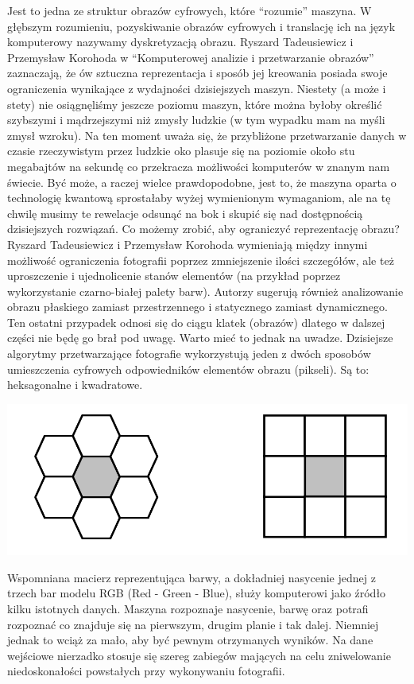 \documentclass{article}
\begin{document}
Jest to jedna ze struktur obrazów cyfrowych, które “rozumie” maszyna. W głębszym rozumieniu, pozyskiwanie obrazów cyfrowych i translację ich na język komputerowy nazywamy dyskretyzacją obrazu. Ryszard Tadeusiewicz i Przemysław Korohoda w “Komputerowej analizie i przetwarzanie obrazów” \cite{ref8} zaznaczają, że ów sztuczna reprezentacja i sposób jej kreowania posiada swoje ograniczenia wynikające z wydajności dzisiejszych maszyn. Niestety (a może i stety) nie osiągnęliśmy jeszcze poziomu maszyn, które można byłoby określić szybszymi i mądrzejszymi niż zmysły ludzkie (w tym wypadku mam na myśli zmysł wzroku). Na ten moment uważa się, że przybliżone przetwarzanie danych w czasie rzeczywistym przez ludzkie oko plasuje się na poziomie około stu megabajtów na sekundę co przekracza możliwości komputerów w znanym nam świecie. Być może, a raczej wielce prawdopodobne, jest to, że maszyna oparta o technologię kwantową sprostałaby wyżej wymienionym wymaganiom, ale na tę chwilę musimy te rewelacje odsunąć na bok i skupić się nad dostępnością dzisiejszych rozwiązań. Co możemy zrobić, aby ograniczyć reprezentację obrazu? Ryszard Tadeusiewicz i Przemysław Korohoda wymieniają między innymi możliwość ograniczenia fotografii poprzez zmniejszenie ilości szczegółów, ale też uproszczenie i ujednolicenie stanów elementów (na przykład poprzez wykorzystanie czarno-białej palety barw). Autorzy sugerują również analizowanie obrazu płaskiego zamiast przestrzennego i statycznego zamiast dynamicznego. Ten ostatni przypadek odnosi się do ciągu klatek (obrazów) dlatego w dalszej części nie będę go brał pod uwagę. Warto mieć to jednak na uwadze. Dzisiejsze algorytmy przetwarzające fotografie wykorzystują jeden z dwóch sposobów umieszczenia cyfrowych odpowiedników elementów obrazu (pikseli). Są to: heksagonalne i kwadratowe.
\begin{center}
\includegraphics[width=15cm]{dyskretyzacja}
\end{center}
Wspomniana macierz reprezentująca barwy, a dokładniej nasycenie jednej z trzech bar modelu RGB (Red - Green - Blue), służy komputerowi jako źródło kilku istotnych danych. Maszyna rozpoznaje nasycenie, barwę oraz potrafi rozpoznać co znajduje się na pierwszym, drugim planie i tak dalej. Niemniej jednak to wciąż za mało, aby być pewnym otrzymanych wyników. Na dane wejściowe nierzadko stosuje się szereg zabiegów mających na celu zniwelowanie niedoskonałości powstałych przy wykonywaniu fotografii.
\end{document}
